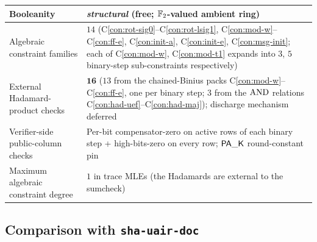 \begin{center}
\begin{tabular}{ll}
\midrule
Booleanity                        & \emph{structural} (free; $\mathbb{F}_2$-valued ambient ring) \\
\midrule
Algebraic constraint families     & $14$ \quad (C\ref{con:rot-sig0}--C\ref{con:rot-lsig1}, C\ref{con:mod-w}--C\ref{con:ff-e}, C\ref{con:init-a}, C\ref{con:init-e}, C\ref{con:msg-init}; each of C\ref{con:mod-w}, C\ref{con:mod-t1} expands into $3$, $5$ binary-step sub-constraints respectively) \\
External Hadamard-product checks  & $\mathbf{16}$ \quad ($13$ from the chained-Binius packs C\ref{con:mod-w}--C\ref{con:ff-e}, one per binary step; $3$ from the $\operatorname{AND}$ relations C\ref{con:had-uef}--C\ref{con:had-maj}); discharge mechanism deferred \\
Verifier-side public-column checks & Per-bit compensator-zero on active rows of each binary step + high-bits-zero on every row; $\mathsf{PA\_K}$ round-constant pin \\
\midrule
Maximum algebraic constraint degree & $1$ \quad in trace MLEs (the Hadamards are external to the sumcheck) \\
\bottomrule
\end{tabular}
\end{center}

\subsection{Comparison with \texttt{sha-uair-doc}}


